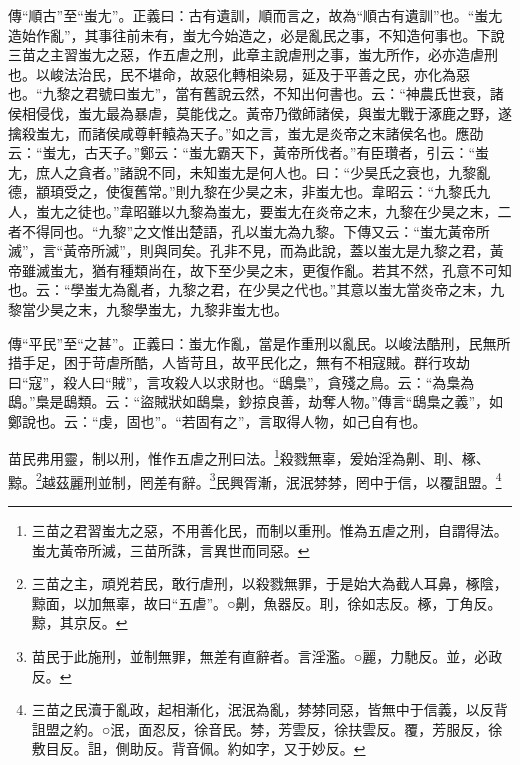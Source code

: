 {\noindent\zhuan{}\fzbyks 傳“順古”至“蚩尢”。正義曰：古有遺訓，順而言之，故為“順古有遺訓”也。“蚩尢造始作亂”，其事往前未有，蚩尢今始造之，必是亂民之事，不知造何事也。下說三苗之主習蚩尢之惡，作五虐之刑，此章主說虐刑之事，蚩尢所作，必亦造虐刑也。以峻法治民，民不堪命，故惡化轉相染易，延及于平善之民，亦化為惡也。“九黎之君號曰蚩尢”，當有舊說云然，不知出何書也。云：“神農氏世衰，諸侯相侵伐，蚩尢最為暴虐，莫能伐之。黃帝乃徵師諸侯，與蚩尢戰于涿鹿之野，遂擒殺蚩尢，而諸侯咸尊軒轅為天子。”如之言，蚩尢是炎帝之末諸侯名也。應劭云：“蚩尢，古天子。”鄭云：“蚩尢霸天下，黃帝所伐者。”有臣瓚者，引云：“蚩尢，庶人之貪者。”諸說不同，未知蚩尢是何人也。曰：“少昊氏之衰也，九黎亂德，顓頊受之，使復舊常。”則九黎在少昊之末，非蚩尢也。韋昭云：“九黎氏九人，蚩尢之徒也。”韋昭雖以九黎為蚩尢，要蚩尢在炎帝之末，九黎在少昊之末，二者不得同也。“九黎”之文惟出楚語，孔以蚩尢為九黎。下傳又云：“蚩尢黃帝所滅”，言“黃帝所滅”，則與同矣。孔非不見，而為此說，蓋以蚩尢是九黎之君，黃帝雖滅蚩尢，猶有種類尚在，故下至少昊之末，更復作亂。若其不然，孔意不可知也。云：“學蚩尢為亂者，九黎之君，在少昊之代也。”其意以蚩尢當炎帝之末，九黎當少昊之末，九黎學蚩尢，九黎非蚩尢也。 \par}

{\noindent\zhuan{}\fzbyks 傳“平民”至“之甚”。正義曰：蚩尢作亂，當是作重刑以亂民。以峻法酷刑，民無所措手足，困于苛虐所酷，人皆苛且，故平民化之，無有不相寇賊。群行攻劫曰“寇”，殺人曰“賊”，言攻殺人以求財也。“鴟梟”，貪殘之鳥。云：“為梟為鴟。”梟是鴟類。云：“盜賊狀如鴟梟，鈔掠良善，劫奪人物。”傳言“鴟梟之義”，如鄭說也。云：“虔，固也”。“若固有之”，言取得人物，如己自有也。 \par}

苗民弗用靈，制以刑，惟作五虐之刑曰法。\footnote{三苗之君習蚩尢之惡，不用善化民，而制以重刑。惟為五虐之刑，自謂得法。蚩尢黃帝所滅，三苗所誅，言異世而同惡。}殺戮無辜，爰始淫為劓、刵、椓、黥。\footnote{三苗之主，頑兇若民，敢行虐刑，以殺戮無罪，于是始大為截人耳鼻，椓陰，黥面，以加無辜，故曰“五虐”。○劓，魚器反。刵，徐如志反。椓，丁角反。黥，其京反。}越茲麗刑並制，罔差有辭。\footnote{苗民于此施刑，並制無罪，無差有直辭者。言淫濫。○麗，力馳反。並，必政反。}民興胥漸，泯泯棼棼，罔中于信，以覆詛盟。\footnote{三苗之民瀆于亂政，起相漸化，泯泯為亂，棼棼同惡，皆無中于信義，以反背詛盟之約。○泯，面忍反，徐音民。棼，芳雲反，徐扶雲反。覆，芳服反，徐敷目反。詛，側助反。背音佩。約如字，又于妙反。}


